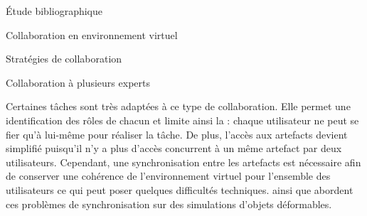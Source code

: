 \documentclass[myfrancais,ngerman,english,french]{mythesis}
\begin{document}
\begin{mychapter}{Étude bibliographique}
\begin{mysection}{Collaboration en environnement virtuel}
\begin{mysubsection}{Stratégies de collaboration}
\begin{mysubsubsection}{Collaboration à plusieurs experts}
\begin{myfigure}
\begin{myps}
							\ncput*[npos=1.5]{\myGrounding}
						\end{myps}
						\let\arraystretch\oldarraystretch
					\end{myfigure}

					Certaines tâches sont très adaptées à ce type de collaboration.
					Elle permet une identification des rôles de chacun et limite ainsi la  : chaque utilisateur ne peut se fier qu'à lui-même pour réaliser la tâche.
					De plus, l'accès aux artefacts devient simplifié puisqu'il n'y a plus d'accès concurrent à un même artefact par deux utilisateurs.
					Cependant, une synchronisation entre les artefacts est nécessaire afin de conserver une cohérence de l'environnement virtuel pour l'ensemble des utilisateurs ce qui peut poser quelques difficultés techniques.
					 ainsi que  abordent ces problèmes de synchronisation sur des simulations d'objets déformables.


\end{mysubsubsection}
\end{mysubsection}
\end{mysection}
\end{mychapter}
\end{document}
